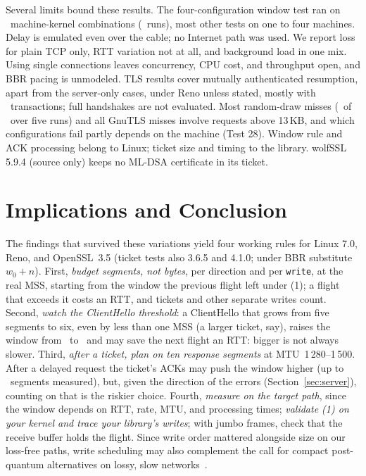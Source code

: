 \documentclass[sigconf,9pt,nonacm]{acmart}
\begin{document}
Several limits bound these results. The four-configuration window test ran on \NCombW\ machine-kernel combinations (\NRunsW\ runs), most other tests on one to four machines. Delay is emulated even over the cable; no Internet path was used. We report loss for plain TCP only, RTT variation not at all, and background load in one mix. Using single connections leaves concurrency, CPU cost, and throughput open, and BBR pacing is unmodeled. TLS results cover mutually authenticated resumption, apart from the server-only cases, under Reno unless stated, mostly with \NPerCell\ transactions; full handshakes are not evaluated. Most random-draw misses (\DomLargeWrong\ of \DomWrongTotal\ over five runs) and all GnuTLS misses involve requests above 13\,KB, and which configurations fail partly depends on the machine (Test 28). Window rule and ACK processing belong to Linux; ticket size and timing to the library. wolfSSL 5.9.4 (source only) keeps no ML-DSA certificate in its ticket.

\section{Implications and Conclusion}\label{sec:recs}
The findings that survived these variations yield four working rules for Linux 7.0, Reno, and OpenSSL~3.5 (ticket tests also 3.6.5 and 4.1.0; under BBR substitute $w_0+n$). First, \emph{budget segments, not bytes}, per direction and per \texttt{write}, at the real MSS, starting from the window the previous flight left under (1); a flight that exceeds it costs an RTT, and tickets and other separate writes count.
Second, \emph{watch the ClientHello threshold}: a ClientHello that grows from five segments to six, even by less than one MSS (a larger ticket, say), raises the window from \WFive\ to \WSix\ and may save the next flight an RTT: bigger is not always slower.
Third, \emph{after a ticket, plan on ten response segments} at MTU~1\,280--1\,500. After a delayed request the ticket's ACKs may push the window higher (up to \GtfWinMax\ segments measured), but, given the direction of the errors (Section~\ref{sec:server}), counting on that is the riskier choice.
Fourth, \emph{measure on the target path}, since the window depends on RTT, rate, MTU, and processing times; \emph{validate (1) on your kernel and trace your library's writes}; with jumbo frames, check that the receive buffer holds the flight.
Since write order mattered alongside size on our loss-free paths, write scheduling may also complement the call for compact post-quantum alternatives on lossy, slow networks~\cite{alnahawi2024}.
\end{document}
